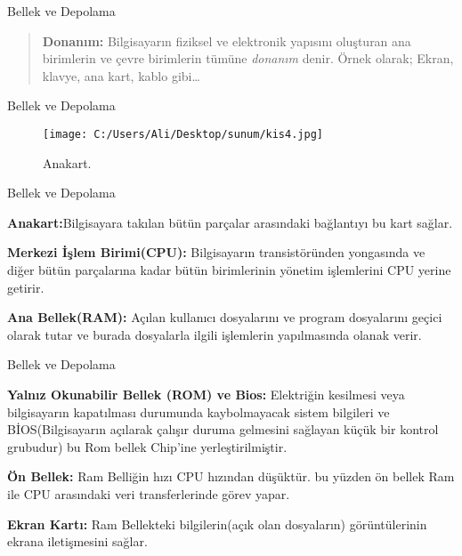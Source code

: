 \documentclass[
  12pt,
  ignorenonframetext,
]{beamer}
\begin{document}
\begin{frame}{Bellek ve Depolama}
\protect\hypertarget{bellek-ve-depolama}{}

\begin{quote}
\textbf{Donanım:} Bilgisayarın fiziksel ve elektronik yapısını oluşturan
ana birimlerin ve çevre birimlerin tümüne \emph{donanım} denir. Örnek
olarak; Ekran, klavye, ana kart, kablo gibi\ldots{}
\end{quote}

\end{frame}

\begin{frame}{Bellek ve Depolama}
\protect\hypertarget{bellek-ve-depolama-1}{}

\begin{figure}
\centering
\texttt{[image: C:/Users/Ali/Desktop/sunum/kis4.jpg]}
\caption{Anakart.}
\end{figure}

\end{frame}

\begin{frame}{Bellek ve Depolama}
\protect\hypertarget{bellek-ve-depolama-2}{}

\justify

\textbf{Anakart:}Bilgisayara takılan bütün parçalar arasındaki
bağlantıyı bu kart sağlar.

\textbf{Merkezi İşlem Birimi(CPU):} Bilgisayarın transistöründen
yongasında ve diğer bütün parçalarına kadar bütün birimlerinin yönetim
işlemlerini CPU yerine getirir.

\textbf{Ana Bellek(RAM):} Açılan kullanıcı dosyalarını ve program
dosyalarını geçici olarak tutar ve burada dosyalarla ilgili işlemlerin
yapılmasında olanak verir.

\end{frame}

\begin{frame}{Bellek ve Depolama}
\protect\hypertarget{bellek-ve-depolama-3}{}

\justify

\textbf{Yalnız Okunabilir Bellek (ROM) ve Bios:} Elektriğin kesilmesi
veya bilgisayarın kapatılması durumunda kaybolmayacak sistem bilgileri
ve BİOS(Bilgisayarın açılarak çalışır duruma gelmesini sağlayan küçük
bir kontrol grubudur) bu Rom bellek Chip'ine yerleştirilmiştir.

\textbf{Ön Bellek:} Ram Belliğin hızı CPU hızından düşüktür. bu yüzden
ön bellek Ram ile CPU arasındaki veri transferlerinde görev yapar.

\textbf{Ekran Kartı:} Ram Bellekteki bilgilerin(açık olan dosyaların)
görüntülerinin ekrana iletişmesini sağlar.

\end{frame}
\end{document}
